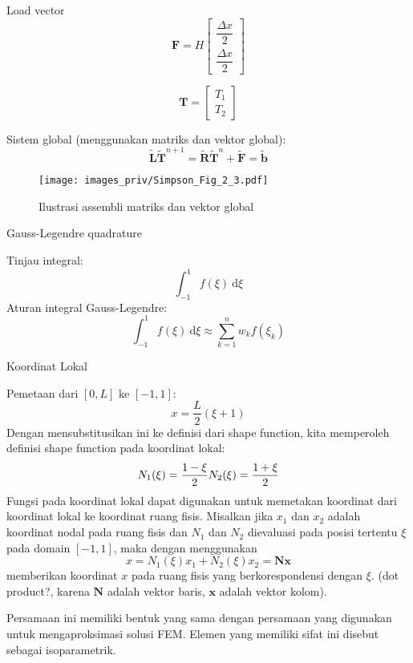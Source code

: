 Load vector
\begin{equation*}
\mathbf{F} = H\begin{bmatrix}
\dfrac{\Delta x}{2} \\
\dfrac{\Delta x}{2}
\end{bmatrix}
\end{equation*}

$$
\mathbf{T} = \begin{bmatrix}
T_1 \\ T_2
\end{bmatrix}
$$

Sistem global (menggunakan matriks dan vektor global):
\begin{equation*}
\tilde{\mathbf{L}} \tilde{\mathbf{T}}^{n+1} = \tilde{\mathbf{R}}
\tilde{\mathbf{T}}^{n} + \tilde{\mathbf{F}} = \tilde{\mathbf{b}}
\end{equation*}


\begin{figure}[h]
{\centering
\texttt{[image: images\_priv/Simpson\_Fig\_2\_3.pdf]}
\par}
\caption{Ilustrasi assembli matriks dan vektor global}
\end{figure}


Gauss-Legendre quadrature

Tinjau integral:
$$
\int_{-1}^{1} f(\xi)\ \mathrm{d}\xi
$$
Aturan integral Gauss-Legendre:
$$
\int_{-1}^{1} f(\xi)\ \mathrm{d}\xi \approx
\sum_{k=1}^{n} w_{k} f(\xi_{k})
$$

Koordinat Lokal

Pemetaan dari $[0,L]$ ke $[-1,1]$:
$$
x = \frac{L}{2}(\xi + 1)
$$
Dengan mensubstitusikan ini ke definisi dari shape function, kita memperoleh definisi shape function pada koordinat lokal:
$$
N_1(\xi) = \frac{1 - \xi}{2} \\
N_2(\xi) = \frac{1 + \xi}{2}
$$
Fungsi pada koordinat lokal dapat digunakan untuk memetakan koordinat dari koordinat lokal ke koordinat ruang fisis. Misalkan jika $x_1$ dan $x_2$ adalah koordinat nodal pada ruang fisis dan $N_1$ dan $N_2$ dievaluasi pada posisi tertentu $\xi$ pada domain $[-1,1]$, maka dengan menggunakan
$$
x = N_1(\xi) x_1 + N_2(\xi) x_{2} = \mathbf{N}\mathbf{x}
$$
memberikan koordinat $x$ pada ruang fisis yang berkorespondensi dengan $\xi$. (dot product?, karena $\mathbf{N}$ adalah vektor baris, $\mathbf{x}$ adalah vektor kolom).

Persamaan ini memiliki bentuk yang sama dengan persamaan yang digunakan untuk mengaproksimasi solusi FEM. Elemen yang memiliki sifat ini disebut sebagai isoparametrik.

